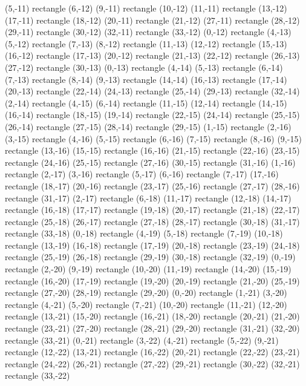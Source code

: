 {  (5,-11) rectangle (6,-12) (9,-11) rectangle (10,-12) (11,-11) rectangle (13,-12) (17,-11) rectangle (18,-12) (20,-11) rectangle (21,-12) (27,-11) rectangle (28,-12) (29,-11) rectangle (30,-12) (32,-11) rectangle (33,-12)%
  (0,-12) rectangle (4,-13) (5,-12) rectangle (7,-13) (8,-12) rectangle (11,-13) (12,-12) rectangle (15,-13) (16,-12) rectangle (17,-13) (20,-12) rectangle (21,-13) (22,-12) rectangle (26,-13) (27,-12) rectangle (30,-13)%
  (0,-13) rectangle (4,-14) (5,-13) rectangle (6,-14) (7,-13) rectangle (8,-14) (9,-13) rectangle (14,-14) (16,-13) rectangle (17,-14) (20,-13) rectangle (22,-14) (24,-13) rectangle (25,-14) (29,-13) rectangle (32,-14)%
  (2,-14) rectangle (4,-15) (6,-14) rectangle (11,-15) (12,-14) rectangle (14,-15) (16,-14) rectangle (18,-15) (19,-14) rectangle (22,-15) (24,-14) rectangle (25,-15) (26,-14) rectangle (27,-15) (28,-14) rectangle (29,-15)%
  (1,-15) rectangle (2,-16) (3,-15) rectangle (4,-16) (5,-15) rectangle (6,-16) (7,-15) rectangle (8,-16) (9,-15) rectangle (13,-16) (15,-15) rectangle (16,-16) (21,-15) rectangle (22,-16) (23,-15) rectangle (24,-16) (25,-15) rectangle (27,-16) (30,-15) rectangle (31,-16)%
  (1,-16) rectangle (2,-17) (3,-16) rectangle (5,-17) (6,-16) rectangle (7,-17) (17,-16) rectangle (18,-17) (20,-16) rectangle (23,-17) (25,-16) rectangle (27,-17) (28,-16) rectangle (31,-17)%
  (2,-17) rectangle (6,-18) (11,-17) rectangle (12,-18) (14,-17) rectangle (16,-18) (17,-17) rectangle (19,-18) (20,-17) rectangle (21,-18) (22,-17) rectangle (25,-18) (26,-17) rectangle (27,-18) (28,-17) rectangle (30,-18) (31,-17) rectangle (33,-18)%
  (0,-18) rectangle (4,-19) (5,-18) rectangle (7,-19) (10,-18) rectangle (13,-19) (16,-18) rectangle (17,-19) (20,-18) rectangle (23,-19) (24,-18) rectangle (25,-19) (26,-18) rectangle (29,-19) (30,-18) rectangle (32,-19)%
  (0,-19) rectangle (2,-20) (9,-19) rectangle (10,-20) (11,-19) rectangle (14,-20) (15,-19) rectangle (16,-20) (17,-19) rectangle (19,-20) (20,-19) rectangle (21,-20) (25,-19) rectangle (27,-20) (28,-19) rectangle (29,-20)%
  (0,-20) rectangle (1,-21) (3,-20) rectangle (4,-21) (5,-20) rectangle (7,-21) (10,-20) rectangle (11,-21) (12,-20) rectangle (13,-21) (15,-20) rectangle (16,-21) (18,-20) rectangle (20,-21) (21,-20) rectangle (23,-21) (27,-20) rectangle (28,-21) (29,-20) rectangle (31,-21) (32,-20) rectangle (33,-21)%
  (0,-21) rectangle (3,-22) (4,-21) rectangle (5,-22) (9,-21) rectangle (12,-22) (13,-21) rectangle (16,-22) (20,-21) rectangle (22,-22) (23,-21) rectangle (24,-22) (26,-21) rectangle (27,-22) (29,-21) rectangle (30,-22) (32,-21) rectangle (33,-22)%
}
